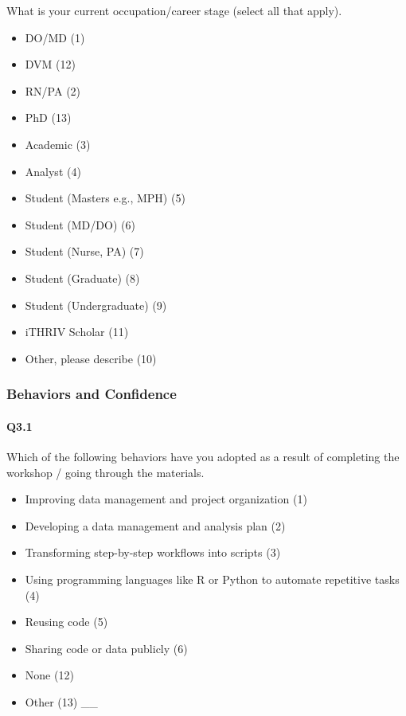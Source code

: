 \documentclass[030-workshop.tex]{subfiles}
\begin{document}
    What is your current occupation/career stage (select all that apply).

    \begin{itemize}
        \item DO/MD  (1)
        \item DVM  (12)
        \item RN/PA  (2)
        \item PhD  (13)
        \item Academic  (3)
        \item Analyst  (4)
        \item Student (Masters e.g., MPH)  (5)
        \item Student (MD/DO)  (6)
        \item Student (Nurse, PA)  (7)
        \item Student (Graduate)  (8)
        \item Student (Undergraduate)  (9)
        \item iTHRIV Scholar  (11)
        \item Other, please describe  (10)
    \end{itemize}

\subsubsection{Behaviors and Confidence}

    \paragraph{Q3.1}

        Which of the following behaviors have you adopted as a result of completing the workshop / going through the materials.

        \begin{itemize}
            \item Improving data management and project organization  (1)
            \item Developing a data management and analysis plan  (2)
            \item Transforming step-by-step workflows into scripts  (3)
            \item Using programming languages like R or Python to automate repetitive tasks  (4)
            \item Reusing code  (5)
            \item Sharing code or data publicly  (6)
            \item None  (12)
            \item Other  (13) \_\_
        \end{itemize}
\end{document}
